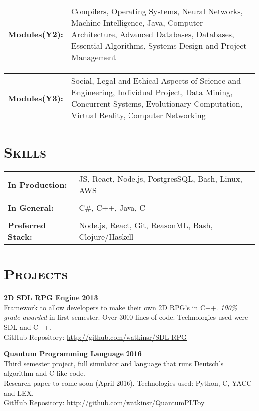 \documentclass[line, margin, 10pt]{res}
\begin{document}
\begin{resume}
\begin{tabular}[t]{@{} p{1.2in} p{3.75in} @{}}  
\bf{Modules(Y2):}  & Compilers,
  Operating Systems,
  Neural Networks,
  Machine Intelligence,
  Java,
  Computer Architecture,
  Advanced Databases,
  Databases,
  Essential Algorithms,
  Systems Design and Project Management
\end{tabular}

\begin{tabular}[t]{@{} p{1.2in} p{3.75in} @{}}  
\bf{Modules(Y3):}  & Social, Legal and Ethical Aspects of Science and Engineering,
  Individual Project,
  Data Mining,
  Concurrent Systems,  
  Evolutionary Computation,
  Virtual Reality,
  Computer Networking
\end{tabular}

\section{\textsc{Skills}}
   \begin{tabular}[t]{@{} p{1.2in} p{3.75in} @{}}
     \bf{In Production:} & JS, React, Node.js, PostgresSQL, Bash, Linux, AWS \\
    \\
    \bf{In General:} & C\#, C++, Java, C  \\
    \\
    \bf{Preferred Stack:} & Node.js, React, Git, ReasonML, Bash, Clojure/Haskell \\
 \end{tabular}

\section{\textsc{Projects}}
{\bf 2D SDL RPG Engine} {\bf \hfill 2013}\\
Framework to allow developers to make their own 2D RPG's in C++. \textit{100\% grade awarded} in first semester. Over 3000 lines of code. Technologies used were SDL and C++.  \\
GitHub Repository: \url{http://github.com/watkinsr/SDL-RPG}

{\bf Quantum Programming Language} {\bf \hfill 2016}\\
Third semester project, full simulator and language that runs Deutsch's algorithm and C-like code.\\ Research paper to come soon (April 2016). Technologies used: Python, C, YACC and LEX.\\ 
GitHub Repository: \url{http://github.com/watkinsr/QuantumPLToy}


\end{resume}
\end{document}

